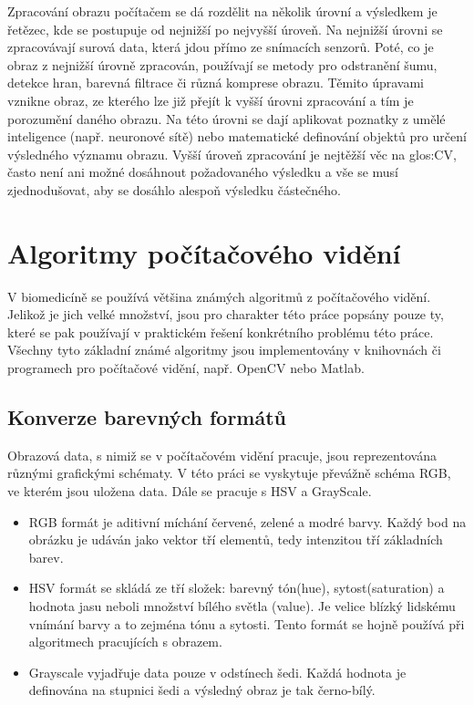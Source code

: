 Zpracování obrazu počítačem se dá rozdělit na několik úrovní a výsledkem je řetězec, kde se postupuje od nejnižší po nejvyšší úroveň. Na nejnižší úrovni se zpracovávají surová data, která jdou přímo ze snímacích senzorů. Poté, co je obraz z nejnižší úrovně zpracován, používají se metody pro odstranění šumu, detekce hran, barevná filtrace či různá komprese obrazu. Těmito úpravami vznikne obraz, ze kterého lze již přejít k vyšší úrovni zpracování a tím je porozumění daného obrazu. Na této úrovni se dají aplikovat poznatky z umělé inteligence (např. neuronové sítě) nebo matematické definování objektů pro určení výsledného významu obrazu. Vyšší úroveň zpracování je nejtěžší věc na \gls{glos:CV}, často není ani možné dosáhnout požadovaného výsledku a vše se musí zjednodušovat, aby se dosáhlo alespoň výsledku částečného. \cite{learning}\cite{image}

\section{Algoritmy počítačového vidění}
V biomedicíně se používá většina známých algoritmů z počítačového vidění. Jelikož je jich velké množství, jsou pro charakter této práce popsány pouze ty, které se pak používají v praktickém řešení konkrétního problému této práce. Všechny tyto základní známé algoritmy jsou implementovány v knihovnách či programech pro počítačové vidění, např. OpenCV nebo Matlab.

\subsection{Konverze barevných formátů}
Obrazová data, s nimiž se v počítačovém vidění pracuje, jsou reprezentována různými grafickými schématy. V této práci se vyskytuje převážně schéma RGB, ve kterém jsou uložena data. Dále se pracuje s HSV a GrayScale.

\begin{itemize}
	\item RGB formát je aditivní míchání červené, zelené a modré barvy. Každý bod na obrázku je udáván jako vektor tří elementů, tedy intenzitou tří základních barev.\cite{image}
	\item HSV formát se skládá ze tří složek: barevný tón(hue), sytost(saturation) a hodnota jasu neboli množství bílého světla (value). Je velice blízký lidskému vnímání barvy a to zejména tónu a sytosti. Tento formát se hojně používá při algoritmech pracujících s obrazem.\cite{image}
	\item Grayscale vyjadřuje data pouze v odstínech šedi. Každá hodnota je definována na stupnici šedi a výsledný obraz je tak černo-bílý.
\end{itemize}

